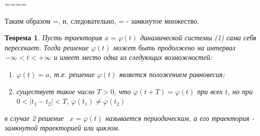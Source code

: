 \documentclass{article}
\theoremstyle{plain} \newtheorem*{theorem*}{Теорема}
\theoremstyle{plain} \newtheorem{theorem}{Теорема}[section]
\begin{document}
====

Таким образом =, и, следовательно, = - замкнутое множество.


\begin{theorem*}
    Пусть траектория $x = \varphi (t)$ динамической системы (1) сама себя пересекает.
    Тогда решение $\varphi (t)$ может быть продолжено на интервал
    $- \infty < t < +\infty$ и имеет место одна из следующих возможностей:
    \begin{enumerate}
        \item $\varphi (t) = a$, т.е. решение $\varphi (t)$
            является положением равновесия;
        \item существует такое число $T > 0$, что $\varphi (t + T) = \varphi (t)$
            при всех $t$, но при $0 < \vert t_1 - t_2 \vert < T$,
            $\varphi (t_1) \neq \varphi(t_2)$
    \end{enumerate}
    в случае 2 решение \ $x = \varphi(t)$ называется периодическим,
    а его траектория - замкнутой траекторией или циклом.
\end{theorem*}
\end{document}
